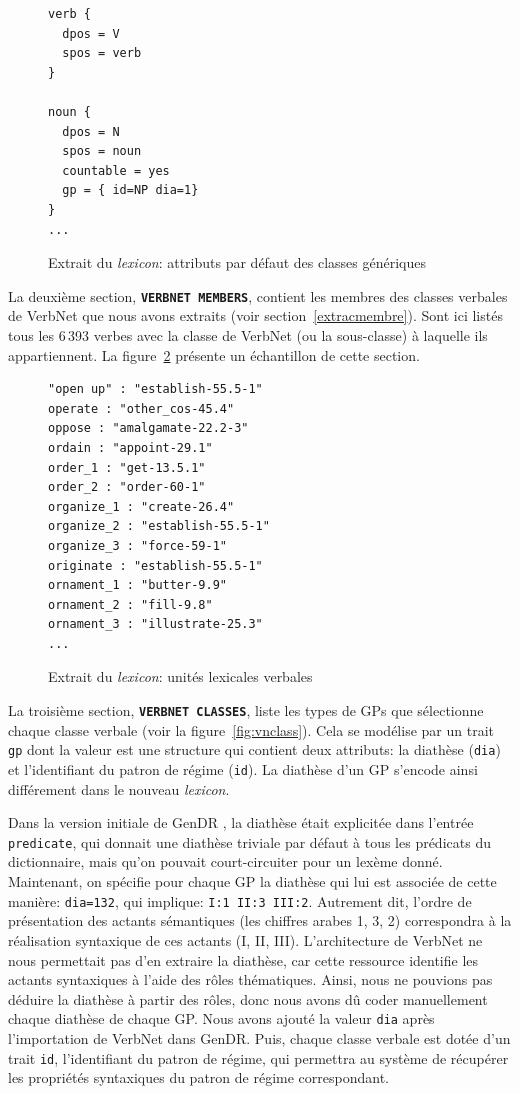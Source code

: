 \begin{figure}[htb]
  \caption{Extrait du \emph{lexicon}: attributs par défaut des classes génériques}
	\label{classedef}
\begin{lstlisting}[language=mate]
verb {
  dpos = V
  spos = verb
}

noun {
  dpos = N
  spos = noun
  countable = yes
  gp = { id=NP dia=1}
}
...
\end{lstlisting}
\end{figure}

La deuxième section, \textbf{\texttt{VERBNET MEMBERS}}, contient les membres des classes verbales de VerbNet que nous avons extraits (voir section~\ref{extracmembre}). Sont ici listés tous les 6\,393 verbes avec la classe de VerbNet (ou la sous-classe) à laquelle ils appartiennent. La figure~\ref{fig:extraituniteslexicales} présente un échantillon de cette section.

\begin{figure}[htb]
  \caption{Extrait du \emph{lexicon}: unités lexicales verbales}
	\label{fig:extraituniteslexicales}
\begin{lstlisting}[language=mate]
"open up" : "establish-55.5-1"
operate : "other_cos-45.4"
oppose : "amalgamate-22.2-3"
ordain : "appoint-29.1"
order_1 : "get-13.5.1"
order_2 : "order-60-1"
organize_1 : "create-26.4"
organize_2 : "establish-55.5-1"
organize_3 : "force-59-1"
originate : "establish-55.5-1"
ornament_1 : "butter-9.9"
ornament_2 : "fill-9.8"
ornament_3 : "illustrate-25.3"
...
\end{lstlisting}
\end{figure}

La troisième section, \textbf{\texttt{VERBNET CLASSES}}, liste les types de \acp{GP} que sélectionne chaque classe verbale (voir la figure~\ref{fig:vnclass}). Cela se modélise par un trait \texttt{gp} dont la valeur est une structure qui contient deux attributs: la diathèse (\texttt{dia}) et l'identifiant du patron de régime (\texttt{id}). La diathèse d'un \ac{GP} s'encode ainsi différement dans le nouveau \emph{lexicon}. 

Dans la version initiale de GenDR \citep{lareau18}, la diathèse était explicitée dans l'entrée \texttt{predicate}, qui donnait une diathèse triviale par défaut à tous les prédicats du dictionnaire, mais qu'on pouvait court-circuiter pour un lexème donné. Maintenant, on spécifie pour chaque \ac{GP} la diathèse qui lui est associée de cette manière: \texttt{dia=132}, qui implique: \texttt{I:1 II:3 III:2}. Autrement dit, l'ordre de présentation des actants sémantiques (les chiffres arabes 1, 3, 2) correspondra à la réalisation syntaxique de ces actants (I, II, III). L'architecture de VerbNet ne nous permettait pas d'en extraire la diathèse, car cette ressource identifie les actants syntaxiques à l'aide des rôles thématiques. Ainsi, nous ne pouvions pas déduire la diathèse à partir des rôles, donc nous avons dû coder manuellement chaque diathèse de chaque \ac{GP}. Nous avons ajouté la valeur \texttt{dia} après l'importation de VerbNet dans GenDR. Puis, chaque classe verbale est dotée d'un trait \texttt{id}, l'identifiant du patron de régime, qui permettra au système de récupérer les propriétés syntaxiques du patron de régime correspondant.

